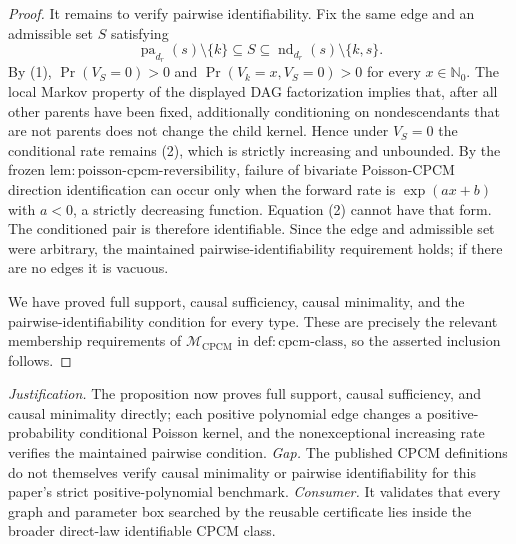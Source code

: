 \documentclass{article}
\begin{document}
\begin{proof}
It remains to verify pairwise identifiability.  Fix the same edge and an admissible set \(S\) satisfying
\[
 \operatorname{pa}_{d_r}(s)\setminus\{k\}
 \subseteq S\subseteq
 \operatorname{nd}_{d_r}(s)\setminus\{k,s\}.
\]
By (1), \(\Pr(V_S=0)>0\) and
\(\Pr(V_k=x,V_S=0)>0\) for every \(x\in\mathbb N_0\).  The local Markov property of the displayed DAG factorization implies that, after all other parents have been fixed, additionally conditioning on nondescendants that are not parents does not change the child kernel.  Hence under \(V_S=0\) the conditional rate remains (2), which is strictly increasing and unbounded.  By the frozen \(\mathrm{lem{:}poisson\text{-}cpcm\text{-}reversibility}\), failure of bivariate Poisson-CPCM direction identification can occur only when the forward rate is \(\exp(ax+b)\) with \(a<0\), a strictly decreasing function.  Equation (2) cannot have that form.  The conditioned pair is therefore identifiable.  Since the edge and admissible set were arbitrary, the maintained pairwise-identifiability requirement holds; if there are no edges it is vacuous.

We have proved full support, causal sufficiency, causal minimality, and the pairwise-identifiability condition for every type.  These are precisely the relevant membership requirements of \(\mathcal M_{\mathrm{CPCM}}\) in \(\mathrm{def{:}cpcm\text{-}class}\), so the asserted inclusion follows.
\end{proof}
\par\smallskip\noindent \textit{Justification.} The proposition now proves full support, causal sufficiency, and causal minimality directly; each positive polynomial edge changes a positive-probability conditional Poisson kernel, and the nonexceptional increasing rate verifies the maintained pairwise condition. \textit{Gap.} The published CPCM definitions do not themselves verify causal minimality or pairwise identifiability for this paper's strict positive-polynomial benchmark. \textit{Consumer.} It validates that every graph and parameter box searched by the reusable certificate lies inside the broader direct-law identifiable CPCM class.
\end{document}
